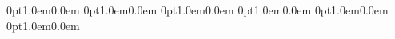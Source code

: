 \titlespacing*{\chapter}
{0pt}{1.0em}{0.0em}
\titlespacing*{\section}
{0pt}{1.0em}{0.0em}
\titlespacing*{\subsection}
{0pt}{1.0em}{0.0em}
\titlespacing*{\subsubsection}
{0pt}{1.0em}{0.0em}
\titlespacing*{\paragraph}
{0pt}{1.0em}{0.0em}
\titlespacing*{\subparagraph}
{0pt}{1.0em}{0.0em}

\parindent=0in
\parskip=5pt

\setcounter{secnumdepth}{5}
\setcounter{tocdepth}{5}

\usepackage{grffile}
\usepackage{pdfpages}


\usepackage[utf8]{inputenc}
\usepackage{graphicx}

\renewcommand{\ttdefault}{pcr}

\usepackage{efbox}

\usepackage{scrextend}
\usepackage{enumitem}

\usepackage{listings}
\usepackage{expl3,xparse}

\makeatletter
\let\old@lstKV@SwitchCases\lstKV@SwitchCases
\def\lstKV@SwitchCases#1#2#3{}
\makeatother
\usepackage{lstlinebgrd}
\makeatletter
\let\lstKV@SwitchCases\old@lstKV@SwitchCases

\makeatother

